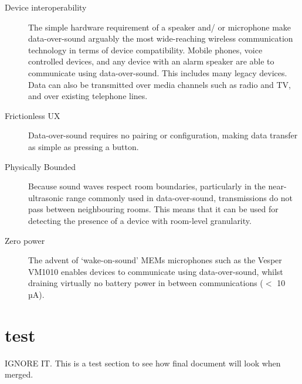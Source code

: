 \documentclass{article}
\begin{document}
\begin{description}
    \item [Device interoperability] The simple hardware requirement of a
        speaker and/ or microphone make data-over-sound arguably the most
        wide-reaching wireless communication technology in terms of device
        compatibility. Mobile phones, voice controlled devices, and any device
        with an alarm speaker are able to communicate using data-over-sound.
        This includes many legacy devices. Data can also be transmitted over
        media channels such as radio and TV, and over existing telephone lines.

    \item [Frictionless UX]  Data-over-sound requires no pairing or
        configuration, making data transfer as simple as pressing a button. 

    \item [Physically Bounded]  Because sound waves respect room boundaries,
        particularly in the near-ultrasonic range commonly used in
        data-over-sound, transmissions do not pass between neighbouring rooms.
        This means that it can be used for detecting the presence of a device
        with room-level granularity.

    \item [Zero power] The advent of ‘wake-on-sound’ MEMs microphones such as
        the Vesper VM1010 enables devices to communicate using data-over-sound,
        whilst draining virtually no battery power in between communications ($<$
        10 µA). 
\end{description}

\printbibliography[heading=subbibliography]


\vspace{2in}
\section{test}
IGNORE IT. This is a test section to see how final document will look when merged. \\

\lipsum[1-1]
\printbibliography[heading=subbibliography]
\end{document}
